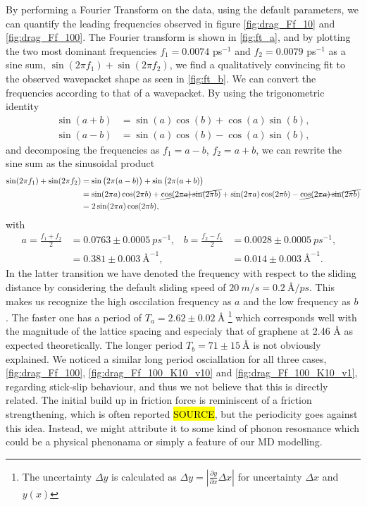 By performing a Fourier Transform on the data, using the default parameters, we can quantify the leading frequencies observed in figure \cref{fig:drag_Ff_10} and \cref{fig:drag_Ff_100}. The Fourier transform is shown in \cref{fig:ft_a}, and by plotting the two most dominant frequencies $f_1 = 0.0074$ ps$^{-1}$ and $f_2 = 0.0079$ ps$^{-1}$ as a sine sum, $\sin{(2\pi f_1)} + \sin{(2\pi f_2)}$, we find a qualitatively convincing fit to the observed wavepacket shape as seen in \cref{fig:ft_b}. We can convert the frequencies according to that of a wavepacket. By using the trigonometric identity
\begin{align*}
\sin (a+b) &= \sin (a) \cos (b) + \cos (a) \sin (b), \\
\sin (a-b) &= \sin (a) \cos (b) - \cos (a) \sin (b),
\end{align*}
and decomposing the frequencies as $f_1 = a - b$, $f_2 = a + b$, we can rewrite the sine sum as the sinusoidal product
\begin{align*}
  \sin(2\pi f_1) + \sin(2\pi f_2) &= \sin\big(2\pi (a - b)\big) + \sin\big(2\pi (a + b)\big) \\
  &= \sin(2\pi a)\cos(2\pi b) + \cancel{\cos(2\pi a)\sin(2\pi b)} + \sin(2\pi a)\cos(2\pi b) - \cancel{\cos(2\pi a)\sin(2\pi b)} \\
  &= 2 \sin(2\pi a) \cos(2\pi b),
\end{align*} 
with 
\begin{align*}
  a = \frac{f_1 + f_2}{2} &= 0.0763 \pm \SI{0.0005}{ps^{-1}},& 
  b = \frac{f_2 - f_1}{2} &= 0.0028 \pm \SI{0.0005}{ps^{-1}},& \\
  &= 0.381 \pm \SI{0.003}{{\text{Å}}^{-1}},& 
  &= 0.014 \pm \SI{0.003}{{\text{Å}}^{-1}}.& 
\end{align*}
In the latter transition we have denoted the frequency with respect to the sliding distance by considering the default sliding speed of $\SI{20}{m/s} = \SI{0.2}{\text{Å}/ps}$. This
makes us recognize the high osccilation frequency as $a$ and the low frequency
as $b$. The faster one has a period of $T_a = 2.62 \pm \SI{0.02}{\text{Å}}$ \footnote{The
uncertainty $\Delta y$ is calculated as $\Delta y = \left|\frac{\partial
y}{\partial x} \Delta x \right|$ for uncertainty $\Delta x$ and $y(x)$} which
corresponds well with the magnitude of the lattice spacing and especialy that of
graphene at 2.46 Å as expected theoretically. The longer period $T_b = 71 \pm
\SI{15}{\text{Å}}$ is not obviously explained. We noticed a similar long period osciallation for all three cases, \cref{fig:drag_Ff_100}, \cref{fig:drag_Ff_100_K10_v10} and \cref{fig:drag_Ff_100_K10_v1}, regarding stick-slip behaviour, and thus we not believe that this is directly related. The initial build up in friction force is reminiscent of a friction strengthening, which is often reported \hl{SOURCE}, but the periodicity goes against this idea. Instead, we might attribute it to some kind of phonon
resosnance which could be a physical phenonama or simply a feature of our
\acrshort{MD} modelling. 


